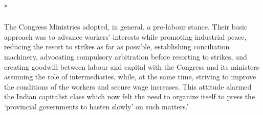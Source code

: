 \begin{multicols}{2}
\begin{center}*\end{center}

\paragraph*{}

The Congress Ministries adopted, in general. a pro-labour stance. Their basic approach was to advance workers' interests while promoting industrial peace, reducing the resort to strikes as far as possible, establishing conciliation machinery, advocating compulsory arbitration before resorting to strikes, and creating goodwill between labour and capital with the Congress and its ministers assuming the role of intermediaries, while, at the same time, striving to improve the conditions of the workers and secure wage increases. This attitude alarmed the Indian capitalist class which now felt the need to organize itself to press the `provincial governments to hasten slowly' on such matters.' 


\end{multicols}
